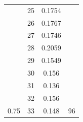 \documentclass{article}
\begin{document}
\begin{multicols}{2}
\begin{table}[H]
\begin{tabular}{|c|c|c|c|}
 & 25 & 0.1754 &  \\ \cline{2-3}
 & 26 & 0.1767 &  \\ \cline{2-3}
 & 27 & 0.1746 &  \\ \cline{2-3}
 & 28 & 0.2059 &  \\ \cline{2-3}
 & 29 & 0.1549 &  \\ \cline{2-3}
 & 30 & 0.156 &  \\ \cline{2-3}
 & 31 & 0.136 &  \\ \cline{2-3}
 & 32 & 0.156 &  \\ \cline{2-3}
\multirow{-34}{*}{0.75} & 33 & 0.148 & \multirow{-9}{*}{96} \\ \hline
\end{tabular}
\end{table}


\end{multicols}
\newpage
\end{document}
